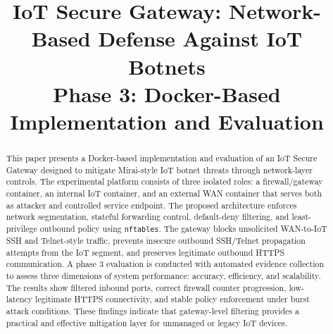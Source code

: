 \documentclass[journal]{IEEEtran}
\begin{document}
\title{IoT Secure Gateway: Network-Based Defense Against IoT Botnets\\Phase 3: Docker-Based Implementation and Evaluation}

\author{
}

\maketitle

\begin{abstract}
This paper presents a Docker-based implementation and evaluation of an IoT Secure Gateway designed to mitigate Mirai-style IoT botnet threats through network-layer controls. The experimental platform consists of three isolated roles: a firewall/gateway container, an internal IoT container, and an external WAN container that serves both as attacker and controlled service endpoint. The proposed architecture enforces network segmentation, stateful forwarding control, default-deny filtering, and least-privilege outbound policy using \texttt{nftables}. The gateway blocks unsolicited WAN-to-IoT SSH and Telnet-style traffic, prevents insecure outbound SSH/Telnet propagation attempts from the IoT segment, and preserves legitimate outbound HTTPS communication. A phase 3 evaluation is conducted with automated evidence collection to assess three dimensions of system performance: accuracy, efficiency, and scalability. The results show filtered inbound ports, correct firewall counter progression, low-latency legitimate HTTPS connectivity, and stable policy enforcement under burst attack conditions. These findings indicate that gateway-level filtering provides a practical and effective mitigation layer for unmanaged or legacy IoT devices.
\end{abstract}
\end{document}
